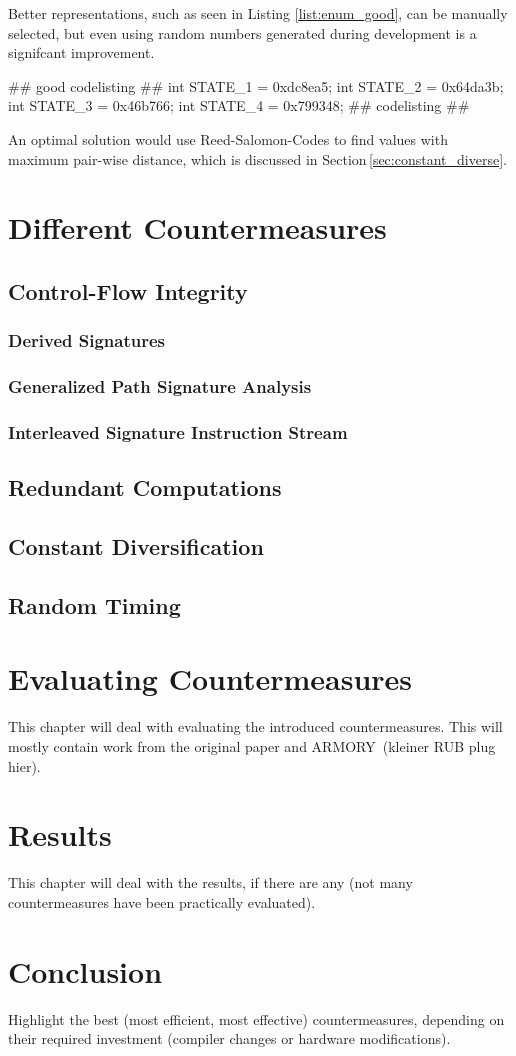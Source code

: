 Better representations, such as seen in Listing \ref{list:enum_good}, can be manually selected, but even using random numbers generated during development is a signifcant improvement.

## good codelisting ##
int STATE_1 = 0xdc8ea5;
int STATE_2 = 0x64da3b;
int STATE_3 = 0x46b766;
int STATE_4 = 0x799348;
\label{list:enum_good}
## codelisting ##

An optimal solution would use Reed-Salomon-Codes  to find values with maximum pair-wise distance, which is discussed in Section\,\ref{sec:constant_diverse}.
\chapter{Different Countermeasures}
\label{chap:counter}


\section{Control-Flow Integrity}
\subsection{Derived Signatures}
\subsection{Generalized Path Signature Analysis}
\subsection{Interleaved Signature Instruction Stream}
\section{Redundant Computations}
\section{Constant Diversification}
\section{Random Timing}

\chapter{Evaluating Countermeasures}
This chapter will deal with evaluating the introduced countermeasures. This will mostly contain work from the original paper and ARMORY\,\cite{9206547} (kleiner RUB plug hier).


\chapter{Results}
This chapter will deal with the results, if there are any (not many countermeasures have been practically evaluated). 

\chapter{Conclusion}
Highlight the best (most efficient, most effective) countermeasures, depending on their required investment (compiler changes or hardware modifications).
